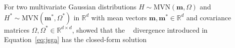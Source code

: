 \documentclass[12pt,compact]{article}
\DeclareMathOperator{\KL}{KL}
\DeclarePairedDelimiter\abs{\lvert}{\rvert}%
\newcommand{\JSGa}{\mathop{\mathrm{JS}^{\mathrm{G}_{\lambda}}}\nolimits}
\newcommand\numberthis{\addtocounter{equation}{1}\tag{\theequation}}
\begin{document}
For two multivariate Gaussian distributions $H \sim \mbox{MVN}(\symbf{m}, \Omega)$ and $H^* \sim \mbox{MVN}(\symbf{m}^*, \Omega^*)$ in $\mathbb{R}^d$ with mean vectors $\symbf{m}, \symbf{m}^* \in \mathbb{R}^d$ and covariance matrices $\Omega, \Omega^* \in \mathbb{R}^{d \times d}$, \citet{Nielsen2019} showed that the $\JSGa{}$ divergence introduced in Equation~\eqref{eq:jsga} has the closed-form solution 
\end{document}

